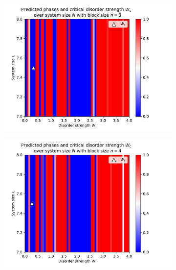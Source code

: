 \documentclass[reprint,amsmath,amssymb,aps,prb]{revtex4-2}
\begin{document}
\begin{center}
\begin{figure}[H]
\begin{subfigure}[c]{0.4\textwidth}
			\includegraphics[width=\textwidth]{../results/Wc/n3_Wc_N_dependency.pdf}
		\end{subfigure}
		\begin{subfigure}[c]{0.4\textwidth}
			\includegraphics[width=\textwidth]{../results/Wc/n4_Wc_N_dependency.pdf}
		\end{subfigure}
		\begin{subfigure}[c]{0.4\textwidth}

\end{subfigure}
\end{figure}
\end{center}
\end{document}
